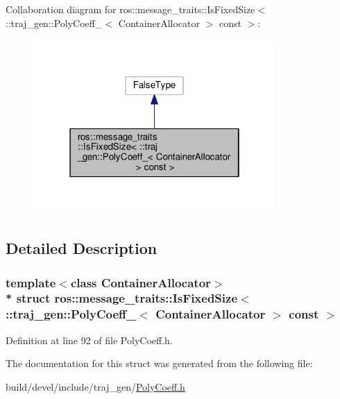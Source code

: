 Collaboration diagram for ros\+:\+:message\+\_\+traits\+:\+:Is\+Fixed\+Size$<$ \+:\+:traj\+\_\+gen\+:\+:Poly\+Coeff\+\_\+$<$ Container\+Allocator $>$ const $>$\+:
\nopagebreak
\begin{figure}[H]
\begin{center}
\leavevmode
\includegraphics[width=262pt]{structros_1_1message__traits_1_1_is_fixed_size_3_01_1_1traj__gen_1_1_poly_coeff___3_01_containerd5f8f91effdefc21ba19e7b7dd5811dc}
\end{center}
\end{figure}


\subsection{Detailed Description}
\subsubsection*{template$<$class Container\+Allocator$>$\\*
struct ros\+::message\+\_\+traits\+::\+Is\+Fixed\+Size$<$ \+::traj\+\_\+gen\+::\+Poly\+Coeff\+\_\+$<$ Container\+Allocator $>$ const  $>$}



Definition at line 92 of file Poly\+Coeff.\+h.



The documentation for this struct was generated from the following file\+:\begin{DoxyCompactItemize}
\item 
build/devel/include/traj\+\_\+gen/\hyperlink{_poly_coeff_8h}{Poly\+Coeff.\+h}\end{DoxyCompactItemize}
